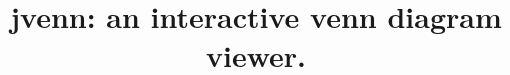\documentclass{bmcart}
\begin{document}
\begin{frontmatter}

\begin{fmbox}


\title{jvenn: an interactive venn diagram viewer.}


\author[
   addressref={aff1},                   %
   corref={aff1},                       %
   noteref={n1},                        %
   email={jane.e.doe@cambridge.co.uk}   %
]{ }
\author[
   addressref={aff1,aff2},
   email={john.RS.Smith@cambridge.co.uk}
]{ }


\address[id=aff1]{%
  , %
  ,                     %
  ,                              %
}
\address[id=aff2]{%
  ,
  ,
  ,
}


\end{fmbox}
\end{frontmatter}
\end{document}

